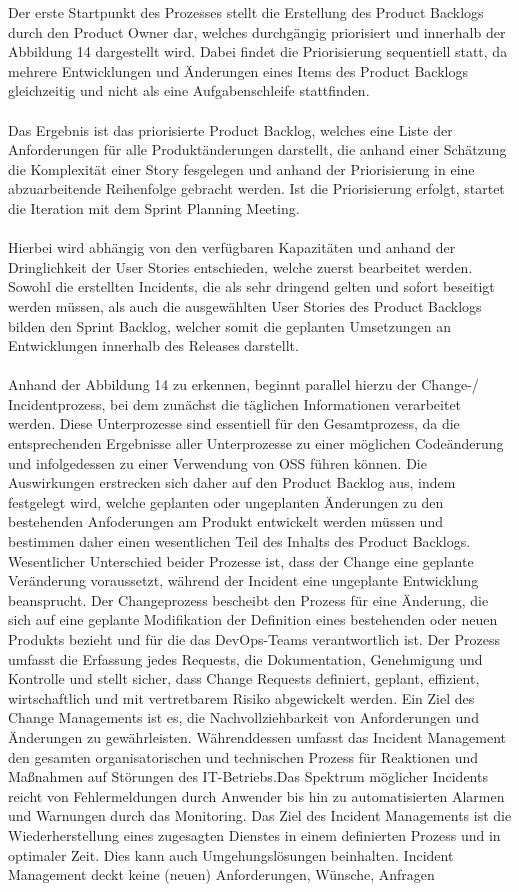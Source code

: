 Der erste Startpunkt des Prozesses stellt die Erstellung des Product Backlogs durch den Product Owner dar, welches durchgängig priorisiert und innerhalb der Abbildung 14 dargestellt wird. Dabei findet die Priorisierung sequentiell statt, da mehrere Entwicklungen und Änderungen eines Items des Product Backlogs gleichzeitig und nicht als eine Aufgabenschleife stattfinden.\\\\ Das Ergebnis ist das priorisierte Product Backlog, welches eine Liste der Anforderungen für alle Produktänderungen darstellt, die anhand einer Schätzung die Komplexität einer Story fesgelegen und anhand der Priorisierung in eine abzuarbeitende Reihenfolge gebracht werden. Ist die Priorisierung erfolgt, startet die Iteration mit dem Sprint Planning Meeting.\\\\ Hierbei wird abhängig von den verfügbaren Kapazitäten und anhand der Dringlichkeit der User Stories entschieden, welche zuerst bearbeitet werden. Sowohl die erstellten Incidents, die als sehr dringend gelten und sofort beseitigt werden müssen, als auch die ausgewählten User Stories des Product Backlogs bilden den Sprint Backlog, welcher somit die geplanten Umsetzungen an Entwicklungen innerhalb des Releases darstellt.\\\\ Anhand der Abbildung 14 zu erkennen, beginnt parallel hierzu der Change-/ Incidentprozess, bei dem zunächst die täglichen Informationen verarbeitet werden. Diese Unterprozesse sind essentiell für den Gesamtprozess, da die entsprechenden Ergebnisse aller Unterprozesse zu einer möglichen Codeänderung und infolgedessen zu einer Verwendung von OSS führen können. Die Auswirkungen erstrecken sich daher auf den Product Backlog aus, indem festgelegt wird, welche geplanten oder ungeplanten Änderungen zu den bestehenden Anfoderungen am Produkt entwickelt werden müssen und bestimmen daher einen wesentlichen Teil des Inhalts des Product Backlogs. Wesentlicher Unterschied beider Prozesse ist, dass der Change eine geplante Veränderung voraussetzt, während der Incident eine ungeplante Entwicklung beansprucht. Der Changeprozess bescheibt den Prozess für eine Änderung, die sich auf eine geplante Modifikation der Definition eines bestehenden oder neuen Produkts bezieht und für die das DevOps-Teams verantwortlich ist. Der Prozess umfasst die Erfassung jedes Requests, die Dokumentation, Genehmigung und Kontrolle und stellt sicher, dass Change Requests definiert, geplant, effizient, wirtschaftlich und mit vertretbarem Risiko abgewickelt werden. Ein Ziel des Change Managements ist es, die Nachvollziehbarkeit von Anforderungen und Änderungen zu gewährleisten. Währenddessen umfasst das Incident Management den gesamten organisatorischen und technischen Prozess für Reaktionen und Maßnahmen auf Störungen des IT-Betriebs.Das Spektrum möglicher Incidents reicht von Fehlermeldungen durch Anwender bis hin zu automatisierten Alarmen und Warnungen durch das Monitoring. Das Ziel des Incident Managements ist die Wiederherstellung eines zugesagten Dienstes in einem definierten Prozess und in optimaler Zeit. Dies kann auch Umgehungslösungen beinhalten. Incident Management deckt keine (neuen) Anforderungen, Wünsche, Anfragen 